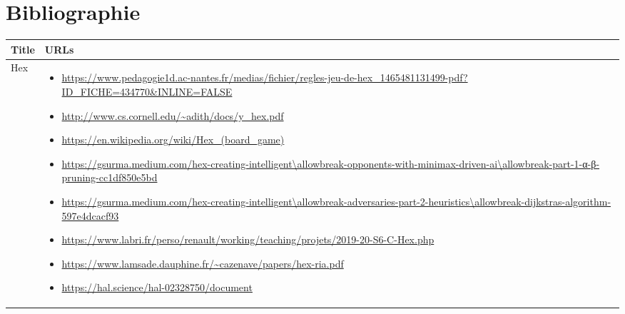 \section{Bibliographie}




\sloppy
\begin{tabular}{|l|p{}|}
    \hline
    \textbf{Title} & \textbf{URLs} \\
    \hline
    Hex & 
    \begin{itemize}
        \item \href{https://www.pedagogie1d.ac-nantes.fr/medias/fichier/regles-jeu-de-hex_1465481131499-pdf?ID_FICHE=434770&INLINE=FALSE}{\url{https://www.pedagogie1d.ac-nantes.fr/medias/fichier/regles-jeu-de-hex_1465481131499-pdf?ID_FICHE=434770&INLINE=FALSE}}
        \item \href{http://www.cs.cornell.edu/~adith/docs/y_hex.pdf}{\url{http://www.cs.cornell.edu/~adith/docs/y_hex.pdf}}
        \item \href{https://en.wikipedia.org/wiki/Hex_(board_game)}{\url{https://en.wikipedia.org/wiki/Hex_(board_game)}}
        \item \href{https://gsurma.medium.com/hex-creating-intelligent-opponents-with-minimax-driven-ai-part-1-α-β-pruning-cc1df850e5bd}{\url{https://gsurma.medium.com/hex-creating-intelligent\allowbreak-opponents-with-minimax-driven-ai\allowbreak-part-1-α-β-pruning-cc1df850e5bd}}
        \item \href{https://gsurma.medium.com/hex-creating-intelligent-adversaries-part-2-heuristics-dijkstras-algorithm-597e4dcacf93}{\url{https://gsurma.medium.com/hex-creating-intelligent\allowbreak-adversaries-part-2-heuristics\allowbreak-dijkstras-algorithm-597e4dcacf93}}
        \item \href{https://www.labri.fr/perso/renault/working/teaching/projets/2019-20-S6-C-Hex.php}{\url{https://www.labri.fr/perso/renault/working/teaching/projets/2019-20-S6-C-Hex.php}}
        \item \href{https://www.lamsade.dauphine.fr/~cazenave/papers/hex-ria.pdf}{\url{https://www.lamsade.dauphine.fr/~cazenave/papers/hex-ria.pdf}}
        \item \href{https://hal.science/hal-02328750/document}{\url{https://hal.science/hal-02328750/document}}

\end{itemize}
\end{tabular}

